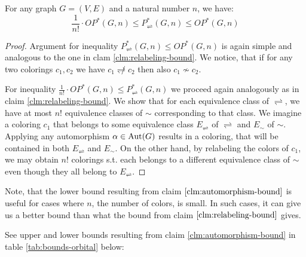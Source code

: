 \begin{claim}\label{clm:automorphism-bound}
    For any graph $G=(V,E)$ and a natural number $n$, we have: $$\frac{1}{n!} \cdot OP^*(G,n) \leq P^*_\rightleftharpoons(G,n) \leq OP^*(G,n)$$
\end{claim}

\begin{proof}

Argument for inequality $P^*_\rightleftharpoons(G,n) \leq OP^*(G,n)$ is again simple and analogous to the one in clam \ref{clm:relabeling-bound}. We notice, that if for any two colorings $c_1,c_2$ we have $c_1 \not\rightleftharpoons c_2$ then also $c_1 \not\sim c_2$.

For inequality $\frac{1}{n!} \cdot OP^*(G,n) \leq P^*_\rightleftharpoons(G,n)$ we proceed again analogously as in claim \ref{clm:relabeling-bound}. We show that for each equivalence class of $\rightleftharpoons$, we have at most $n!$ equivalence classes of $\sim$ corresponding to that class. We imagine a coloring $c_1$ that belongs to some equivalence class $E_\rightleftharpoons$ of $\rightleftharpoons$ and $E_\sim$ of $\sim$. Applying any automorphism $\alpha \in \operatorname{Aut}(G)$ results in a coloring, that will be contained in both $E_\rightleftharpoons$ and $E_\sim$. On the other hand, by relabeling the colors of $c_1$, we may obtain $n!$ colorings s.t. each belongs to a different equivalence class of $\sim$ even though they all belong to $E_\rightleftharpoons$.

\end{proof}

Note, that the lower bound resulting from claim $\ref{clm:automorphism-bound}$ is useful for cases where $n$, the number of colors, is small. In such cases, it can give us a better bound than what the bound from claim $\ref{clm:relabeling-bound}$ gives.

See upper and lower bounds resulting from claim \ref{clm:automorphism-bound} in table \ref{tab:bounds-orbital} below:

